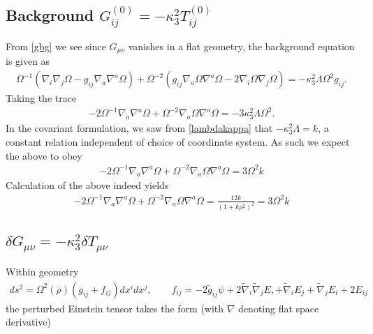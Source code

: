 \documentclass[10pt,letterpaper]{article}
\numberwithin{equation}{section}
\begin{document}
\subsection{Background $G^{(0)}_{ij} = -\kappa^2_3 T_{ij}^{(0)}$}
From \eqref{gbg} we see since $G_{\mu\nu}$ vanishes in a flat geometry, the background equation is given as
\begin{eqnarray}
\Omega^{-1}\left(  \nabla_i\nabla_j \Omega - g_{ij}\nabla_a\nabla^a\Omega\right)  + \Omega^{-2} \left( g_{ij} \nabla_a\Omega\nabla^a\Omega -2 \nabla_i \Omega\nabla_j\Omega\right) 
= -\kappa_3^2 \Lambda \Omega^2 g_{ij}. 
\label{dgtbg}
\end{eqnarray}
Taking the trace
\begin{eqnarray}
-2\Omega^{-1} \nabla_a\nabla^a \Omega + \Omega^{-2} \nabla_a\Omega \nabla^a\Omega = -3\kappa_3^2 \Lambda \Omega^2.
\end{eqnarray}
In the covariant formulation, we saw from \eqref{lambdakappa} that $-\kappa^2_3\Lambda = k$, a constant relation independent of choice of coordinate system. As such we expect the above to obey
\begin{eqnarray}
-2\Omega^{-1} \nabla_a\nabla^a \Omega + \Omega^{-2} \nabla_a\Omega \nabla^a\Omega = 3\Omega^2 k
\end{eqnarray}
Calculation of the above indeed yields
\begin{eqnarray}
-2\Omega^{-1} \nabla_a\nabla^a \Omega + \Omega^{-2} \nabla_a\Omega \nabla^a\Omega = \frac{12k}{(1+k\rho^2)^2} = 3\Omega^2 k
\end{eqnarray}


\subsection{$\delta G_{\mu\nu} = -\kappa^2_3 \delta T_{\mu\nu}$}
Within geometry
\begin{eqnarray}
ds^2 = \Omega^2(\rho)(g_{ij} + f_{ij})dx^idx^j,\qquad f_{ij} = -2\tilde g_{ij}\psi + 2\tilde\nabla_i\tilde\nabla_j E,
+\tilde\nabla_i E_j+\tilde\nabla_j E_i + 2E_{ij}
\end{eqnarray}
 the perturbed Einstein tensor takes the form (with $ \nabla$ denoting flat space derivative)
\end{document}
